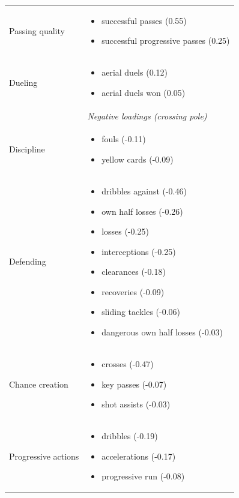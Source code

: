 \begin{longtable}{p{2.6cm}p{13cm}}
Passing quality & \begin{itemize}[nosep,leftmargin=1.1em,topsep=1pt]
    \item successful passes (0.55)
    \item successful progressive passes (0.25)
  \end{itemize}\\
Dueling & \begin{itemize}[nosep,leftmargin=1.1em,topsep=1pt]
    \item aerial duels (0.12)
    \item aerial duels won (0.05)
  \end{itemize}\\[4pt]
 & \textit{Negative loadings (crossing pole)}\\
Discipline & \begin{itemize}[nosep,leftmargin=1.1em,topsep=1pt]
    \item fouls (-0.11)
    \item yellow cards (-0.09)
  \end{itemize}\\
Defending & \begin{itemize}[nosep,leftmargin=1.1em,topsep=1pt]
    \item dribbles against (-0.46)
    \item own half losses (-0.26)
    \item losses (-0.25)
    \item interceptions (-0.25)
    \item clearances (-0.18)
    \item recoveries (-0.09)
    \item sliding tackles (-0.06)
    \item dangerous own half losses (-0.03)
  \end{itemize}\\
Chance creation & \begin{itemize}[nosep,leftmargin=1.1em,topsep=1pt]
    \item crosses (-0.47)
    \item key passes (-0.07)
    \item shot assists (-0.03)
  \end{itemize}\\
Progressive actions & \begin{itemize}[nosep,leftmargin=1.1em,topsep=1pt]
    \item dribbles (-0.19)
    \item accelerations (-0.17)
    \item progressive run (-0.08)

\end{itemize}
\end{longtable}
